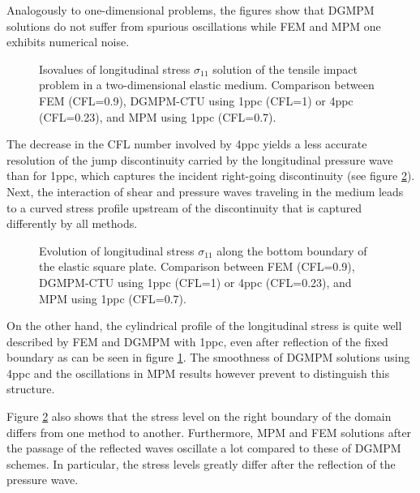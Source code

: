Analogously to one-dimensional problems, the figures show that DGMPM solutions do not suffer from spurious oscillations while FEM and MPM one exhibits numerical noise.
\begin{figure}[h!]
  \centering
  
  \caption{Isovalues of longitudinal stress $\sigma_{11}$ solution of the tensile impact problem in a two-dimensional elastic medium. Comparison between FEM (CFL=0.9), DGMPM-CTU using 1ppc (CFL=1) or 4ppc (CFL=0.23), and MPM using 1ppc (CFL=0.7).}
  \label{fig:2delast_comparison}
\end{figure}
The decrease in the CFL number involved by 4ppc yields a less accurate resolution of the jump discontinuity carried by the longitudinal pressure wave than for 1ppc, which captures the incident right-going discontinuity (see figure \ref{fig:elastlines}).
Next, the interaction of shear and pressure waves traveling in the medium leads to a curved stress profile upstream of the discontinuity that is captured differently by all methods.  
\begin{figure}[h!]
  { \label{subfig:line_elast1}}
  { \label{subfig:line_elast2}}
  
  \caption{Evolution of longitudinal stress $\sigma_{11}$ along the bottom boundary of the elastic square plate. Comparison between FEM (CFL=0.9), DGMPM-CTU using 1ppc (CFL=1) or 4ppc (CFL=0.23), and MPM using 1ppc (CFL=0.7).}
  \label{fig:elastlines}
\end{figure}
On the other hand, the cylindrical profile of the longitudinal stress is quite well described by FEM and DGMPM with 1ppc, even after reflection of the fixed boundary as can be seen in figure \ref{fig:2delast_comparison}. The smoothness of DGMPM solutions using 4ppc and the oscillations in MPM results however prevent to distinguish this structure.

Figure \ref{fig:elastlines} also shows that the stress level on the right boundary of the domain differs from one method to another. Furthermore, MPM and FEM solutions after the passage of the reflected waves oscillate a lot compared to these of DGMPM schemes. In particular, the stress levels greatly differ after the reflection of the pressure wave.


